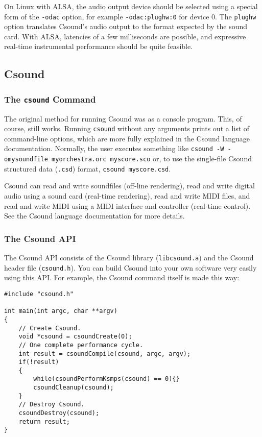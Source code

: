 \documentclass[10pt,letterpaper,onecolumn]{book}
\begin{document}
On Linux with ALSA, the audio output device should be selected using a special form of the \texttt{-odac} option, for example \texttt{-odac:plughw:0} for device 0. The \texttt{plughw} option translates Csound's audio output to the format expected by the sound card. With ALSA, latencies of a few milliseconds are possible, and expressive real-time instrumental performance should be quite feasible.

\subsection{Csound}

\subsubsection{The \texttt{csound} Command}

The original method for running Csound was as a console program. This, of course, still works. Running \texttt{csound} without any arguments prints out a list of command-line options, which are more fully explained in the Csound language documentation. Normally, the user executes something like \texttt{csound -W -omysoundfile myorchestra.orc myscore.sco} or, to use the single-file Csound structured data (\texttt{.csd}) format, \texttt{csound myscore.csd}.

Csound can read and write soundfiles (off-line rendering), read and write digital audio using a sound card (real-time rendering), read and write MIDI files, and read and write MIDI using a MIDI interface and controller (real-time control). See the Csound language documentation for more details. 

\subsubsection{The Csound API}

The Csound API consists of the Csound library (\texttt{libcsound.a}) and the Csound header file (\texttt{csound.h}). You can build Csound into your own software very easily using this API. For example, the Csound command itself is made this way:

\begin{lstlisting}
#include "csound.h"

int main(int argc, char **argv)
{
    // Create Csound.
    void *csound = csoundCreate(0);
    // One complete performance cycle.
    int result = csoundCompile(csound, argc, argv);
    if(!result)
    {
        while(csoundPerformKsmps(csound) == 0){}
        csoundCleanup(csound);
    }
    // Destroy Csound.
    csoundDestroy(csound);
    return result;
}
\end{lstlisting}
\end{document}
